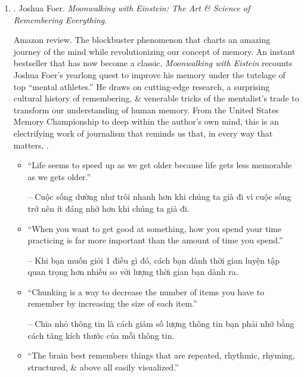\documentclass{article}
\begin{document}
\begin{enumerate}
	\item \cite{Foer_remember}. {\sc Joshua Foer}. {\it Moonwalking with Einstein: The Art \& Science of Remembering Everything}. {}

	{\sf Amazon review.} The blockbuster phenomenon that charts an amazing journey of the mind while revolutionizing our concept of memory. An instant bestseller that has now become a classic, {\it Moonwalking with {\sc Eistein}} recounts {\sc Joshua Foer}'s yearlong quest to improve his memory under the tutelage of top ``mental athletes.'' He draws on cutting-edge research, a surprising cultural history of remembering, \& venerable tricks of the mentalist's trade to transform our understanding of human memory. From the United States Memory Championship to deep within the author's own mind, this is an electrifying work of journalism that reminds us that, in every way that matters, .
	\begin{itemize}
		\item ``Life seems to speed up as we get older because life gets less memorable as we gets older.''

		-- Cuộc sống dường như trôi nhanh hơn khi chúng ta già đi vì cuộc sống trở nên ít đáng nhớ hơn khi chúng ta già đi.
		\item ``When you want to get good at something, how you spend your time practicing is far more important than the amount of time you spend.''

		-- Khi bạn muốn giỏi 1 điều gì đó, cách bạn dành thời gian luyện tập quan trọng hơn nhiều so với lượng thời gian bạn dành ra.
		\item ``Chunking is a way to decrease the number of items you have to remember by increasing the size of each item.''

		-- Chia nhỏ thông tin là cách giảm số lượng thông tin bạn phải nhớ bằng cách tăng kích thước của mỗi thông tin.
		\item ``The brain best remembers things that are repeated, rhythmic, rhyming, structured, \& above all easily visualized.''


\end{itemize}
\end{enumerate}
\end{document}
